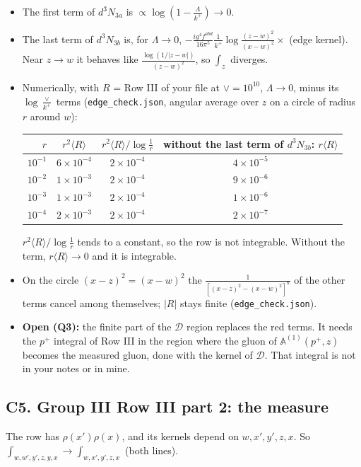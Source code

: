 \documentclass[9pt]{article}
\numberwithin{equation}{section}
\begin{document}
\begin{itemize}
\item The first term of $d^3N_{3a}$ is $\propto\log(1-\frac{\Lambda}{k^+})\to0$.
\item The last term of $d^3N_{3b}$ is, for $\Lambda\to0$, $-\frac{ig^4f^{abd}}{16\pi^5}\frac{1}{k^+}\log\frac{(z-w)^2}{(x-w)^2}\times$ (edge kernel). Near $z\to w$ it behaves like $\frac{\log(1/|z-w|)}{(z-w)^2}$, so $\int_z$ diverges.
\item Numerically, with $R$ = Row III of your file at $\vee=10^{10}$, $\Lambda\to0$, minus its $\log\frac{\vee}{k^+}$ terms (\texttt{edge\_check.json}, angular average over $z$ on a circle of radius $r$ around $w$):
\begin{center}\small
\begin{tabular}{@{}rccc@{}}\toprule
$r$ & $r^2\langle R\rangle$ & $r^2\langle R\rangle/\log\frac1r$ & without the last term of $d^3N_{3b}$: $r\langle R\rangle$\\\midrule
$10^{-1}$ & $6\times10^{-4}$ & $2\times10^{-4}$ & $4\times10^{-5}$\\
$10^{-2}$ & $1\times10^{-3}$ & $2\times10^{-4}$ & $9\times10^{-6}$\\
$10^{-3}$ & $1\times10^{-3}$ & $2\times10^{-4}$ & $1\times10^{-6}$\\
$10^{-4}$ & $2\times10^{-3}$ & $2\times10^{-4}$ & $2\times10^{-7}$\\
\bottomrule
\end{tabular}
\end{center}
$r^2\langle R\rangle/\log\frac1r$ tends to a constant, so the row is not integrable. Without the term, $r\langle R\rangle\to0$ and it is integrable.
\item On the circle $(x-z)^2=(x-w)^2$ the $\frac{1}{[(x-z)^2-(x-w)^2]^n}$ of the other terms cancel among themselves; $|R|$ stays finite (\texttt{edge\_check.json}).
\item \textbf{Open (Q3):} the finite part of the $\mathcal D$ region replaces the red terms. It needs the $p^+$ integral of Row III in the region where the gluon of $\mathbb A^{(1)}(p^+,z)$ becomes the measured gluon, done with the kernel of $\mathcal D$. That integral is not in your notes or in mine.
\end{itemize}

\subsection*{C5. Group III Row III part 2: the measure}
The row has $\rho(x')\rho(x)$, and its kernels depend on $w,x',y',z,x$. So $\int_{w,w',y',z,y,x}\to\int_{w,x',y',z,x}$ (both lines).
\end{document}
